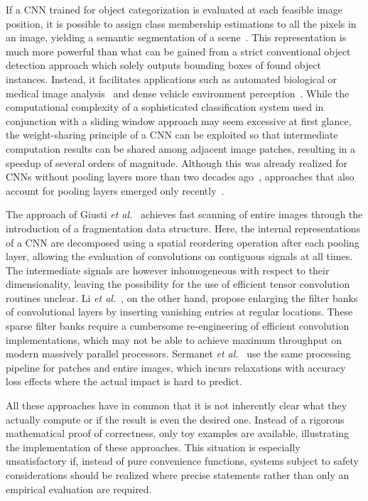 \documentclass[journal]{IEEEtran}
\begin{document}
If a CNN trained for object categorization is evaluated at each feasible image position, it is possible to assign class membership estimations to all the pixels in an image, yielding a semantic segmentation of a scene~\cite{Ning2005,Grangier2009,Farabet2013}.
This representation is much more powerful than what can be gained from a strict conventional object detection approach which solely outputs bounding boxes of found object instances.
Instead, it facilitates applications such as automated biological or medical image analysis~\cite{Ning2005,Giusti2013,Thong2016} and dense vehicle environment perception~\cite{Nuss2014}.
While the computational complexity of a sophisticated classification system used in conjunction with a sliding window approach may seem excessive at first glance, the weight-sharing principle of a CNN can be exploited so that intermediate computation results can be shared among adjacent image patches, resulting in a speedup of several orders of magnitude.
Although this was already realized for CNNs without pooling layers more than two decades ago~\cite{Vaillant1993}, approaches that also account for pooling layers emerged only recently~\cite{Giusti2013,Li2014,Sermanet2014}.

The approach of Giusti \emph{et al.}~\cite{Giusti2013} achieves fast scanning of entire images through the introduction of a fragmentation data structure.
Here, the internal representations of a CNN are decomposed using a spatial reordering operation after each pooling layer, allowing the evaluation of convolutions on contiguous signals at all times.
The intermediate signals are however inhomogeneous with respect to their dimensionality, leaving the possibility for the use of efficient tensor convolution routines unclear.
Li \emph{et al.}~\cite{Li2014}, on the other hand, propose enlarging the filter banks of convolutional layers by inserting vanishing entries at regular locations.
These sparse filter banks require a cumbersome re-engineering of efficient convolution implementations, which may not be able to achieve maximum throughput on modern massively parallel processors.
Sermanet \emph{et al.}~\cite{Sermanet2014} use the same processing pipeline for patches and entire images, which incurs relaxations with accuracy loss effects where the actual impact is hard to predict.

All these approaches have in common that it is not inherently clear what they actually compute or if the result is even the desired one.
Instead of a rigorous mathematical proof of correctness, only toy examples are available, illustrating the implementation of these approaches.
This situation is especially unsatisfactory if, instead of pure convenience functions, systems subject to safety considerations should be realized where precise statements rather than only an empirical evaluation are required.
\end{document}
